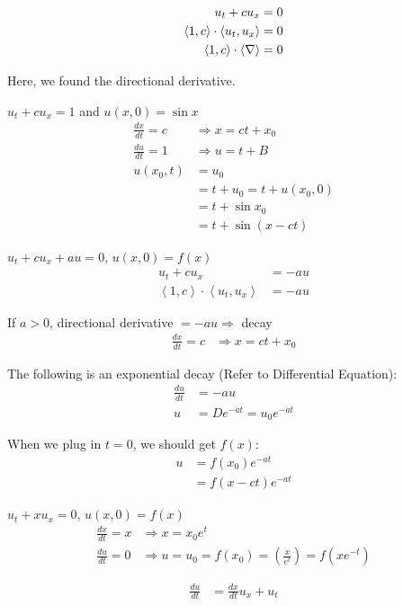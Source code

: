 \documentclass{article}
\begin{document}
\note
%
\begin{align}
  u_t + cu_x & = 0\\
  \left< 1, c \right> \cdot \left< u_t, u_x \right> & = 0\\
  \left< 1, c \right> \cdot \left< \nabla \right> & = 0
\end{align}

Here, we found the directional derivative.

\ex $u_t + cu_x = 1$ and $u(x, 0) = \sin x$
%
\begin{align}
  \frac{dx}{dt} = c & \Rightarrow x = ct + x_0\\
  \frac{du}{dt} = 1 & \Rightarrow u = t + B\\
  u(x_0, t) & = u_0\\
  & = t + u_0 = t + u(x_0, 0)\\
  & = t + \sin x_0\\
  & = t + \sin(x - ct)
\end{align}

\ex $u_t + cu_x + au = 0$, $u(x, 0) = f(x)$
%
\begin{align}
  u_t + cu_x & = -au\\
  \left< 1, c \right> \cdot \left< u_t, u_x \right> & = -au
\end{align}

If $a > 0$, directional derivative $= -au \Rightarrow$ decay
%
\begin{align}
  \frac{dx}{dt} = c & \Rightarrow x = ct + x_0
\end{align}

The following is an exponential decay (Refer to Differential Equation):
%
\begin{align}
  \frac{du}{dt} & = -au\\
  u & = De^{-at} = u_0 e^{-at}
\end{align}

When we plug in $t = 0$, we should get $f(x)$:
%
\begin{align}
  u & = f(x_0) e^{-at}\\
  & = f(x - ct) e^{-at}
\end{align}

\ex $u_t + xu_x = 0$, $u(x, 0) = f(x)$
%
\begin{align}
  \frac{dx}{dt} = x & \Rightarrow x = x_0 e^t\\
  \frac{du}{dt} = 0 & \Rightarrow u = u_0 = f(x_0) = \left(\frac{x}{e^t}\right)
  = f(xe^{-t})
\end{align}

%
\begin{align}
  \frac{du}{dt} & = \frac{dx}{dt} u_x + u_t
\end{align}
\end{document}
